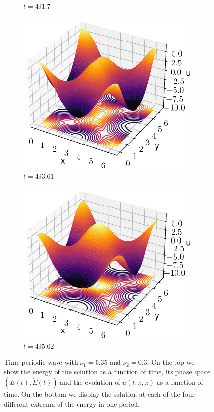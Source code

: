 \documentclass[twoside]{article}
\begin{document}
\begin{figure}
\begin{subfigure}[ht]{0.24\textwidth}
    \caption{$t=491.7$}
  \end{subfigure}\hfill
  \begin{subfigure}[ht]{0.24\textwidth}
    \includegraphics[width=\textwidth]{images/slice_nu1_0.35_nu2_0.3_time_493.61.pdf}
    \caption{$t=493.61$}
  \end{subfigure}\hfill
  \begin{subfigure}[ht]{0.24\textwidth}
    \includegraphics[width=\textwidth]{images/slice_nu1_0.35_nu2_0.3_time_495.62.pdf}
    \caption{$t=495.62$}
  \end{subfigure}
  \caption{Time-periodic wave with $\nu_1=0.35$ and $\nu_2=0.3$. On the top we show the energy of the solution as a function of time, its phase space $(E(t), \dot{E}(t))$ and the evolution of $u(t,\pi,\pi)$ as a function of time. On the bottom we display the solution at each of the four different extrema of the energy in one period.}
  \label{fig:sections_tp}
\end{figure}
\end{document}
